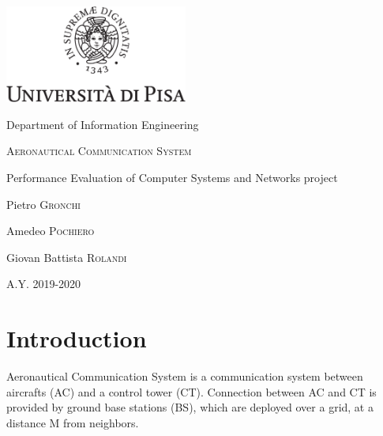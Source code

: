 \documentclass[a4paper,12pt]{article}
\newcommand{\projectname}{Aeronautical Communication System}
\begin{document}

{
  \begin{titlepage}
  	\centering
  	\includegraphics[width=6cm]{img/unipi.pdf}\par
    \vspace{1.5cm}
    {\Large Department of Information Engineering \par}
  	\vspace{1.5cm}
  	{\huge\textsc{\projectname{}}\par}
    \vspace{0.5cm}
    {\Large Performance Evaluation of Computer Systems and Networks project \par}
  	\vspace{2cm}
  	Pietro \textsc{Gronchi}\par
  	Amedeo \textsc{Pochiero}\par
    Giovan Battista \textsc{Rolandi}

  	\vfill

  	{\large A.Y. 2019-2020\par}
  \end{titlepage}
}


\clearpage
\tableofcontents
\clearpage
{}

\section{Introduction} \label{Introduction}
\projectname{} is a communication system between aircrafts (AC) and a control tower (CT).
Connection between AC and CT is provided by ground base stations (BS), which are deployed over a grid, at a distance M from neighbors.
\end{document}
